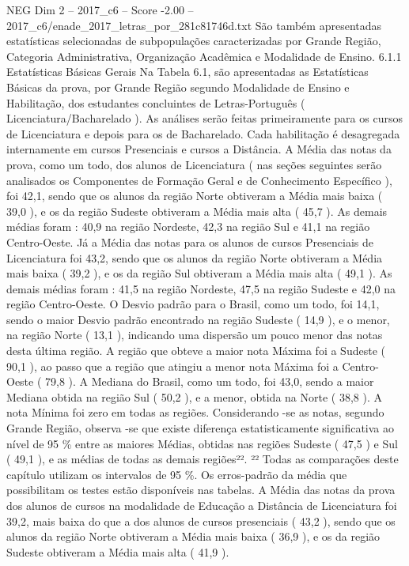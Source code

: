 \begin{textsample}{NEG Dim 2 – 2017\_c6 – Score -2.00 – 2017\_c6/enade\_2017\_letras\_por\_281c81746d.txt}
São também apresentadas estatísticas selecionadas de subpopulações caracterizadas por Grande Região, Categoria Administrativa, Organização Acadêmica e Modalidade de Ensino. 6.1.1 Estatísticas Básicas Gerais Na Tabela 6.1, são apresentadas as Estatísticas Básicas da prova, por Grande Região segundo Modalidade de Ensino e Habilitação, dos estudantes concluintes de Letras-Português ( Licenciatura/Bacharelado ).
As análises serão feitas primeiramente para os cursos de Licenciatura e depois para os de Bacharelado.
Cada habilitação é desagregada internamente em cursos Presenciais e cursos a Distância.
A Média das notas da prova, como um todo, dos alunos de Licenciatura ( nas seções seguintes serão analisados os Componentes de Formação Geral e de Conhecimento Específico ), foi 42,1, sendo que os alunos da região Norte obtiveram a Média mais baixa ( 39,0 ), e os da região Sudeste obtiveram a Média mais alta ( 45,7 ).
As demais médias foram : 40,9 na região Nordeste, 42,3 na região Sul e 41,1 na região Centro-Oeste.
Já a Média das notas para os alunos de cursos Presenciais de Licenciatura foi 43,2, sendo que os alunos da região Norte obtiveram a Média mais baixa ( 39,2 ), e os da região Sul obtiveram a Média mais alta ( 49,1 ).
As demais médias foram : 41,5 na região Nordeste, 47,5 na região Sudeste e 42,0 na região Centro-Oeste.
O Desvio padrão para o Brasil, como um todo, foi 14,1, sendo o maior Desvio padrão encontrado na região Sudeste ( 14,9 ), e o menor, na região Norte ( 13,1 ), indicando uma dispersão um pouco menor das notas desta última região.
A região que obteve a maior nota Máxima foi a Sudeste ( 90,1 ), ao passo que a região que atingiu a menor nota Máxima foi a Centro-Oeste ( 79,8 ).
A Mediana do Brasil, como um todo, foi 43,0, sendo a maior Mediana obtida na região Sul ( 50,2 ), e a menor, obtida na Norte ( 38,8 ).
A nota Mínima foi zero em todas as regiões.
Considerando -se as notas, segundo Grande Região, observa -se que existe diferença estatisticamente significativa ao nível de 95 \% entre as maiores Médias, obtidas nas regiões Sudeste ( 47,5 ) e Sul ( 49,1 ), e as médias de todas as demais regiões²². ²² Todas as comparações deste capítulo utilizam os intervalos de 95 \%.
Os erros-padrão da média que possibilitam os testes estão disponíveis nas tabelas.
A Média das notas da prova dos alunos de cursos na modalidade de Educação a Distância de Licenciatura foi 39,2, mais baixa do que a dos alunos de cursos presenciais ( 43,2 ), sendo que os alunos da região Norte obtiveram a Média mais baixa ( 36,9 ), e os da região Sudeste obtiveram a Média mais alta ( 41,9 ).

\end{textsample}
